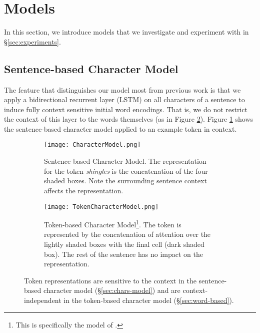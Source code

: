 \documentclass[11pt,a4paper]{article}
\begin{document}
\section{Models}
\label{sec:models}

In this section, we introduce models that we investigate and experiment with in \S\ref{sec:experiments}.


\subsection{Sentence-based Character Model}

The feature that distinguishes our model most from previous work is that we apply a bidirectional recurrent layer (LSTM) on all characters of a sentence to induce fully context sensitive initial word encodings. 
That is, we do not restrict the context of this layer to the words themselves (as in Figure \ref{fig:tokencharmodel}). 
Figure \ref{fig:charmodel} shows the sentence-based character
model applied to an example token in context.



\label{sec:chars-model}
\begin{figure*}
\centering
\begin{subfigure}[t]{0.47\textwidth}
    \texttt{[image: CharacterModel.png]}
    \vspace{-0.5in}
    \caption{Sentence-based Character Model.  The representation for the token \emph{shingles} is the concatenation of the four shaded boxes.  Note the surrounding sentence context affects the representation.}
    \label{fig:charmodel}
\end{subfigure}
\hspace{.3cm}
\begin{subfigure}[t]{0.47\textwidth}
\texttt{[image: TokenCharacterModel.png]}
\vspace{-0.5in}
\caption{Token-based Character Model\footnote{This is specifically the model of .}.  The token is represented by the concatenation of attention over the lightly shaded boxes with the final cell (dark shaded box).  The rest of the sentence has no impact on the representation.}
\label{fig:tokencharmodel}
\end{subfigure}
\caption{Token representations
are sensitive to the context
in the sentence-based character model (\S\ref{sec:chars-model})
and are context-independent
in the token-based character model (\S\ref{sec:word-based}).}
\label{fig:comparingcharmodels}
\end{figure*}
\end{document}
